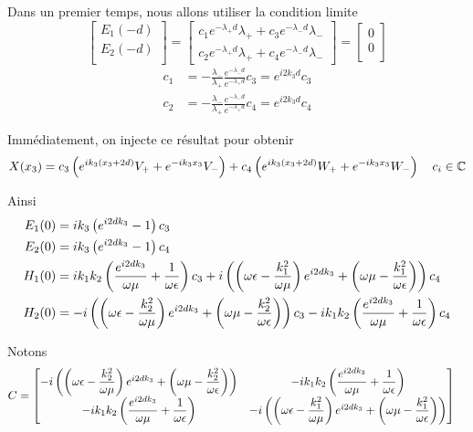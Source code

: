 Dans un premier temps, nous allons utiliser la condition limite 
\begin{equation}
    \begin{bmatrix}
        E_1(-d)\\
        E_2(-d)\\
    \end{bmatrix}
    =
    \begin{bmatrix}
        c_1 e^{-\lambda_+ d} \lambda_{+} + c_3 e^{-\lambda_- d} \lambda_{-} \\
        c_2 e^{-\lambda_+ d} \lambda_{+} + c_4 e^{-\lambda_- d} \lambda_{-}
    \end{bmatrix}
    =    
    \begin{bmatrix}
        0\\
        0\\
    \end{bmatrix}
\end{equation}
\begin{align}
    c_1 &= -\frac{\lambda_-}{\lambda_+}\frac{e^{-\lambda_-d}}{e^{-\lambda_+d}}c_3 = e^{i2k_3d}c_3\\
    c_2 &= -\frac{\lambda_-}{\lambda_+}\frac{e^{-\lambda_-d}}{e^{-\lambda_+d}}c_4 = e^{i2k_3d}c_4
\end{align}


Immédiatement, on injecte ce résultat pour obtenir
\begin{equation}
    X(x_3) = c_3\left(e^{ik_3(x_3 + 2d)}V_+ + e^{-ik_3x_3}V_- \right)  + c_4\left(e^{ik_3(x_3 + 2d)}W_+ + e^{-ik_3 x_3}W_- \right) \quad c_i \in \mathbb C
\end{equation}

Ainsi
\begin{align}
 E_1(0) &= ik_3\left(e^{i2dk_3} - 1\right)c_3 \\
 E_2(0) &= ik_3\left(e^{i2dk_3} - 1\right)c_4 \\
 H_1(0) &= 
     ik_1k_2\left(\dfrac{e^{i2dk_3}}{\omega\mu} + \dfrac{1}{\omega\epsilon}\right)c_3 
    + i\left( \left(\omega\epsilon-\dfrac{k_1^2}{\omega\mu}\right)e^{i2dk_3} + \left(\omega\mu-\dfrac{k_1^2}{\omega\epsilon}\right) \right)c_4 \\
 H_2(0) &=
    - i\left( \left(\omega\epsilon-\dfrac{k_2^2}{\omega\mu}\right)e^{i2dk_3} + \left(\omega\mu-\dfrac{k_2^2}{\omega\epsilon}\right) \right)c_3
    -i k_1k_2\left(\dfrac{e^{i2dk_3}}{\omega\mu} + \dfrac{1}{\omega\epsilon}\right)c_4
\end{align}

Notons
\begin{align}
C &= 
\begin{bmatrix}
- i\left( \left(\omega\epsilon-\dfrac{k_2^2}{\omega\mu}\right)e^{i2dk_3} + \left(\omega\mu-\dfrac{k_2^2}{\omega\epsilon}\right) \right) & -i k_1k_2\left(\dfrac{e^{i2dk_3}}{\omega\mu} + \dfrac{1}{\omega\epsilon}\right)\\
- ik_1k_2\left(\dfrac{e^{i2dk_3}}{\omega\mu} + \dfrac{1}{\omega\epsilon}\right) &  - i\left( \left(\omega\epsilon-\dfrac{k_1^2}{\omega\mu}\right)e^{i2dk_3} + \left(\omega\mu-\dfrac{k_1^2}{\omega\epsilon}\right) \right)
\end{bmatrix}
\end{align}

